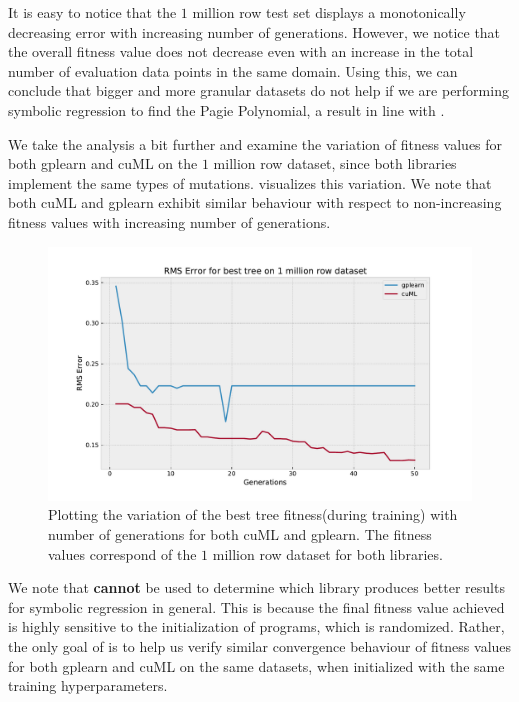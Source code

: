 It is easy to notice that the $1$ million row test set displays a monotonically decreasing error with increasing number of generations. However, we notice that the overall fitness value does not decrease even with an increase in the total number of evaluation data points in the same domain. Using this, we can conclude that bigger and more granular datasets do not help if we are performing symbolic regression to find the Pagie Polynomial, a result in line with \citep{baeta2021speed}.

We take the analysis a bit further and examine the variation of fitness values for both gplearn and cuML on the $1$ million row dataset, since both libraries implement the same types of mutations.  visualizes this variation. We note that both cuML and gplearn exhibit similar behaviour with respect to non-increasing fitness values with increasing number of generations. 

\begin{figure}[h]
  \centering
  \includegraphics[scale=0.59]{images/RMSErrorGPLEARN.pdf}
  \caption{Plotting the variation of the best tree fitness(during training) with number of generations for both cuML and gplearn. The fitness values correspond of the $1$ million row dataset for both libraries.}
  \label{fig:gplearnvscuML1mil}
\end{figure}

We note that  \textbf{cannot} be used to determine which library produces better results for symbolic regression in general. This is because the final fitness value achieved is highly sensitive to the initialization of programs, which is randomized. Rather, the only goal of  is to help us verify similar convergence behaviour of fitness values for both gplearn and cuML on the same datasets, when initialized with the same training hyperparameters.

